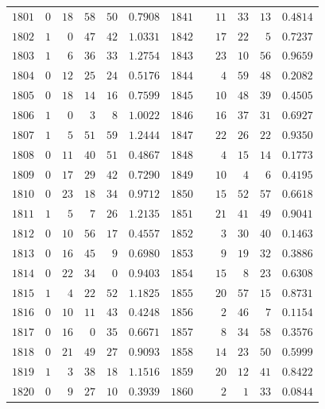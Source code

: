 \begin{center}
{{\begin{minipage}{.96\linewidth}
\begin{tabular}{r|rrrr|r||r|rrrr|r}
$1801$ & $0$ & $18$ & $58$ & $50$ & $0.7908$ & $1841$ &  & $11$ & $33$ & $13$ & $0.4814$\\
$1802$ & $1$ & $0$ & $47$ & $42$ & $1.0331$ & $1842$ &  & $17$ & $22$ & $5$ & $0.7237$\\
$1803$ & $1$ & $6$ & $36$ & $33$ & $1.2754$ & $1843$ &  & $23$ & $10$ & $56$ & $0.9659$\\
$1804$ & $0$ & $12$ & $25$ & $24$ & $0.5176$ & $1844$ &  & $4$ & $59$ & $48$ & $0.2082$\\
$1805$ & $0$ & $18$ & $14$ & $16$ & $0.7599$ & $1845$ &  & $10$ & $48$ & $39$ & $0.4505$\\[3pt]
$1806$ & $1$ & $0$ & $3$ & $8$ & $1.0022$ & $1846$ &  & $16$ & $37$ & $31$ & $0.6927$\\
$1807$ & $1$ & $5$ & $51$ & $59$ & $1.2444$ & $1847$ &  & $22$ & $26$ & $22$ & $0.9350$\\
$1808$ & $0$ & $11$ & $40$ & $51$ & $0.4867$ & $1848$ &  & $4$ & $15$ & $14$ & $0.1773$\\
$1809$ & $0$ & $17$ & $29$ & $42$ & $0.7290$ & $1849$ &  & $10$ & $4$ & $6$ & $0.4195$\\
$1810$ & $0$ & $23$ & $18$ & $34$ & $0.9712$ & $1850$ &  & $15$ & $52$ & $57$ & $0.6618$\\[3pt]
$1811$ & $1$ & $5$ & $7$ & $26$ & $1.2135$ & $1851$ &  & $21$ & $41$ & $49$ & $0.9041$\\
$1812$ & $0$ & $10$ & $56$ & $17$ & $0.4557$ & $1852$ &  & $3$ & $30$ & $40$ & $0.1463$\\
$1813$ & $0$ & $16$ & $45$ & $9$ & $0.6980$ & $1853$ &  & $9$ & $19$ & $32$ & $0.3886$\\
$1814$ & $0$ & $22$ & $34$ & $0$ & $0.9403$ & $1854$ &  & $15$ & $8$ & $23$ & $0.6308$\\
$1815$ & $1$ & $4$ & $22$ & $52$ & $1.1825$ & $1855$ &  & $20$ & $57$ & $15$ & $0.8731$\\[3pt]
$1816$ & $0$ & $10$ & $11$ & $43$ & $0.4248$ & $1856$ &  & $2$ & $46$ & $7$ & $0.1154$\\
$1817$ & $0$ & $16$ & $0$ & $35$ & $0.6671$ & $1857$ &  & $8$ & $34$ & $58$ & $0.3576$\\
$1818$ & $0$ & $21$ & $49$ & $27$ & $0.9093$ & $1858$ &  & $14$ & $23$ & $50$ & $0.5999$\\
$1819$ & $1$ & $3$ & $38$ & $18$ & $1.1516$ & $1859$ &  & $20$ & $12$ & $41$ & $0.8422$\\
$1820$ & $0$ & $9$ & $27$ & $10$ & $0.3939$ & $1860$ &  & $2$ & $1$ & $33$ & $0.0844$\\[3pt]

\end{tabular}
\end{minipage}}}
\end{center}
